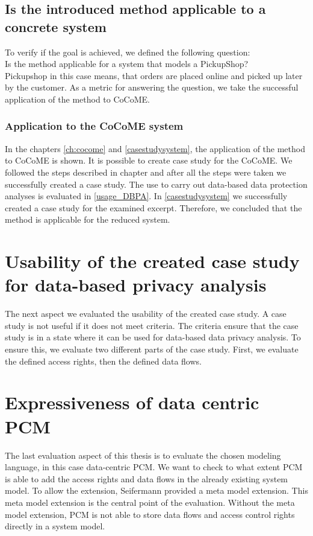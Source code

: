 \subsection{Is the introduced method applicable to a concrete system}
To verify if the goal is achieved, we defined the following question:\\
Is the method applicable for a system that models a PickupShop?\\
Pickupshop in this case means, that orders are placed online and picked up later by the customer.
As a metric for answering the question, we take the successful application of the method to CoCoME. 
\subsubsection{Application to the CoCoME system}
In the chapters \autoref{ch:cocome} and \autoref{casestudysystem}, the application of the method to CoCoME is shown. It is possible to create case study for the CoCoME. We followed the steps described in chapter  and after all the steps were taken we successfully created a case study. The use to carry out data-based data protection analyses is evaluated in  \autoref{usage_DBPA}. In \autoref{casestudysystem} we successfully created a case study for the examined excerpt. Therefore, we concluded that the method is applicable for the reduced system.
\section{Usability of the created case study for data-based privacy analysis}
\label{usage_DBPA}
The next aspect we evaluated the usability of the created case study. A case study is not useful if it does not meet criteria. The criteria ensure that the case study is in a state where it can be used for data-based data privacy analysis. To ensure this, we evaluate two different parts of the case study. First, we evaluate the defined access rights, then the defined data flows. 


\section{Expressiveness of data centric PCM}
The last evaluation aspect of this thesis is to evaluate the chosen modeling language, in this case data-centric PCM. We want to check to what extent PCM is able to add the access rights and data flows in the already existing system model. To allow the extension, Seifermann \cite{MMextension} provided a meta model extension. This meta model extension is the central point of the evaluation. Without the meta model extension, PCM is not able to store data flows and access control rights directly in a system model. 
